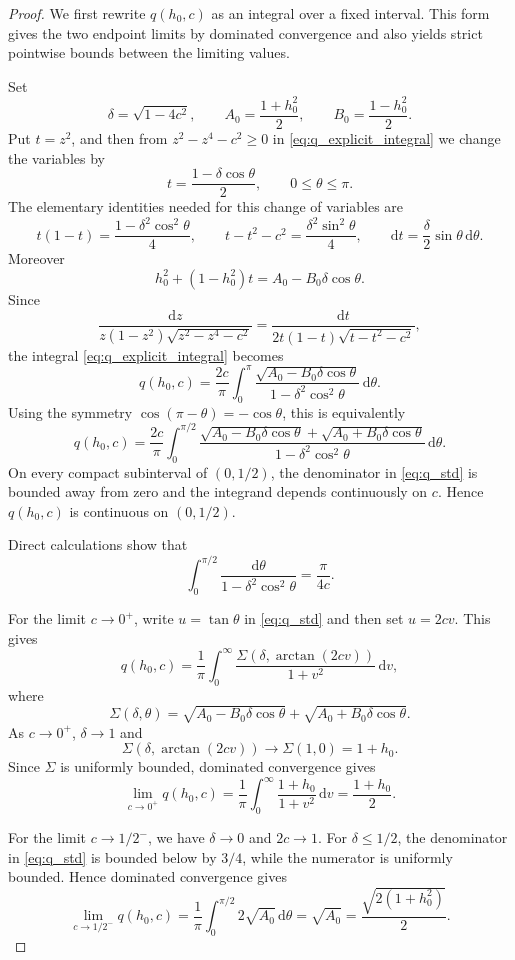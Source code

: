 \documentclass[10pt,a4paper]{amsart}
\newcommand{\dif}{\mathrm{d}}
\begin{document}
\begin{proof}
We first rewrite $q(h_0,c)$ as an integral over a fixed interval. This
form gives the two endpoint limits by dominated convergence and also yields
strict pointwise bounds between the limiting values.

Set
\[
\delta=\sqrt{1-4c^2},\qquad
A_0=\frac{1+h_0^2}{2},\qquad
B_0=\frac{1-h_0^2}{2}.
\]
Put $t=z^2$, and then from $z^2-z^4-c^2\geq0$ in \eqref{eq:q_explicit_integral} we change the variables by
\[
t=\frac{1-\delta\cos\theta}{2},\qquad 0\le\theta\le\pi.
\]
The elementary identities needed for this change of variables are
\[
    t(1-t)=\frac{1-\delta^2\cos^2\theta}{4},
    \qquad
    t-t^2-c^2=\frac{\delta^2\sin^2\theta}{4},
    \qquad
    \dif t=\frac{\delta}{2}\sin\theta\,\dif\theta.
\]
Moreover
\[
    h_0^2+(1-h_0^2)t=A_0-B_0\delta\cos\theta.
\]
Since
\[
    \frac{\dif z}{z(1-z^2)\sqrt{z^2-z^4-c^2}}
    =
    \frac{\dif t}{2t(1-t)\sqrt{t-t^2-c^2}},
\]
the integral \eqref{eq:q_explicit_integral}  becomes
\[
q(h_0,c)=
\frac{2c}{\pi}
\int_0^\pi
\frac{\sqrt{A_0-B_0\delta\cos\theta}}
{1-\delta^2\cos^2\theta}
\,\dif\theta.
\]
Using the symmetry $\cos(\pi-\theta)=-\cos\theta$, this is equivalently
\begin{equation}\label{eq:q_std}
q(h_0,c)
=
\frac{2c}{\pi}
\int_0^{\pi/2}
\frac{
\sqrt{A_0-B_0\delta\cos\theta}
+
\sqrt{A_0+B_0\delta\cos\theta}
}
{1-\delta^2\cos^2\theta}
\,\dif\theta.
\end{equation}
On every compact subinterval of $(0,1/2)$, the denominator in
\eqref{eq:q_std} is bounded away from zero and the integrand depends
continuously on $c$. Hence $q(h_0,c)$ is continuous on $(0,1/2)$.

Direct calculations show that
\begin{equation}\label{eq:int_aux}
\int_0^{\pi/2}
\frac{\dif\theta}{1-\delta^2\cos^2\theta}
=
\frac{\pi}{4c}.
\end{equation}


For the limit $c\to0^+$, write $u=\tan\theta$ in
\eqref{eq:q_std} and then set $u=2cv$. This gives
\[
q(h_0,c)
=
\frac1\pi
\int_0^\infty
\frac{
\Sigma(\delta,\arctan(2cv))
}
{1+v^2}\,\dif v,
\]
where
\[
\Sigma(\delta,\theta)
=
\sqrt{A_0-B_0\delta\cos\theta}
+
\sqrt{A_0+B_0\delta\cos\theta}.
\]
As $c\to0^+$, $\delta\to1$ and
\[
\Sigma(\delta,\arctan(2cv))\to \Sigma(1,0)=1+h_0.
\]
Since $\Sigma$ is uniformly bounded, dominated convergence gives
\[
\lim_{c\to0^+}q(h_0,c)
=
\frac1\pi
\int_0^\infty
\frac{1+h_0}{1+v^2}\,\dif v
=
\frac{1+h_0}{2}.
\]

For the limit $c\to1/2^-$, we have $\delta\to0$ and $2c\to1$.
For $\delta\leq1/2$, the denominator in \eqref{eq:q_std} is bounded
below by $3/4$, while the numerator is uniformly bounded. Hence dominated
convergence gives
\[
\lim_{c\to1/2^-}q(h_0,c)
=
\frac1\pi
\int_0^{\pi/2}2\sqrt{A_0}\,\dif\theta
=
\sqrt{A_0}
=
\frac{\sqrt{2(1+h_0^2)}}{2}.
\]


\end{proof}
\end{document}
